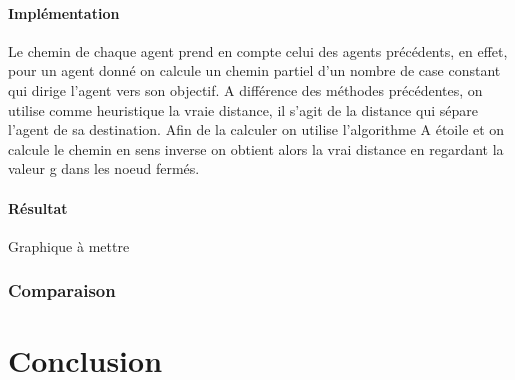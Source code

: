 \documentclass{article}
\begin{document}
			\subsection{Implémentation}
			Le chemin de chaque agent prend en compte celui des agents précédents, en effet, pour un agent donné on calcule un chemin partiel d'un nombre de case constant qui dirige l'agent vers son objectif. A différence des méthodes précédentes, on utilise comme heuristique la vraie distance, il s'agit de la distance qui sépare l'agent de sa destination. Afin de la calculer on utilise l'algorithme A étoile et on calcule le chemin en sens inverse on obtient alors la vrai distance en regardant la valeur g dans les noeud fermés.
			
			\subsection{Résultat}
			Graphique à mettre
					
		\section{Comparaison}
	
	\part{Conclusion}
		
\end{document}

